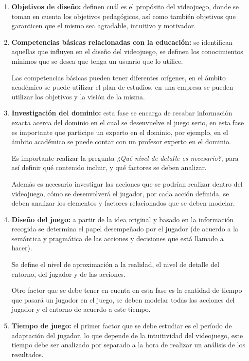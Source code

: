 \begin{enumerate}
\item \textbf{Objetivos de diseño:} definen cuál es el propósito del videojuego, donde
    se toman en cuenta los objetivos pedagógicos, así como también objetivos que
    garanticen que el mismo sea agradable, intuitivo y motivador.

\item \textbf{Competencias básicas relacionadas con la educación:} se identifican
    aquellas que influyen en el diseño del videojuego, se definen los conocimientos
    mínimos que se desea que tenga un usuario que lo utilice.

Las competencias básicas pueden tener diferentes orígenes, en el ámbito
académico se puede utilizar el plan de estudios, en una empresa se pueden
utilizar los objetivos y la visión de la misma.

\item \textbf{Investigación del dominio:} esta fase se encarga de recabar
    información exacta acerca del dominio en el cual se desenvuelve el juego
    serio, en esta fase es importante que participe un experto en el dominio,
    por ejemplo, en el ámbito académico se puede contar con un profesor experto
    en el dominio.

Es importante realizar la pregunta \emph{¿Qué nivel de detalle es necesario?},
para así definir qué contenido incluir, y qué factores se deben analizar.

Además es necesario investigar las acciones que se podrían realizar dentro del
videojuego, cómo se desenvolverá el jugador, por cada acción definida, se deben
analizar los elementos y factores relacionados que se deben modelar.

\item \textbf{Diseño del juego:} a partir de la idea original y basado en la
    información recogida se determina el papel desempeñado por el jugador (de
    acuerdo a la semántica y pragmática de las acciones y decisiones que está
    llamado a hacer). 

Se define el nivel de aproximación a la realidad, el nivel de detalle del
entorno, del jugador y de las acciones.

Otro factor que se debe tener en cuenta en esta fase es la cantidad de tiempo
que pasará un jugador en el juego, se deben modelar todas las acciones del
jugador y el entorno de acuerdo a este tiempo.

\item \textbf{Tiempo de juego:} el primer factor que se debe estudiar es el
    período de adaptación del jugador, lo que depende de la intuitividad del
    videojuego, este tiempo debe ser analizado por separado a la hora de realizar un
    análisis de los resultados.
    

\end{enumerate}
